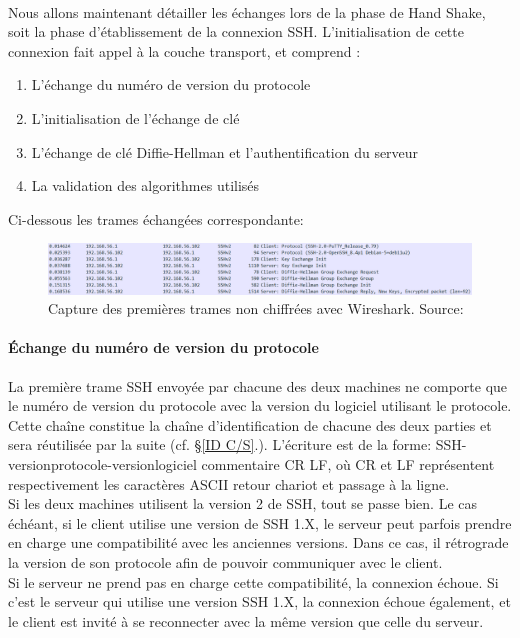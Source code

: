 \paragraph{}
Nous allons maintenant détailler les échanges lors de la phase de \og Hand Shake\fg, soit la phase d'établissement de la connexion SSH. L'initialisation de cette connexion fait appel à la couche transport, et comprend \cite{cadegros_etude_2023} :

\begin{enumerate}
    \item L'échange du numéro de version du protocole
    \item L'initialisation de l'échange de clé
    \item L'échange de clé Diffie-Hellman et l'authentification du serveur
    \item La validation des algorithmes utilisés
\end{enumerate}

Ci-dessous les trames échangées correspondante:

\begin{figure}[H]
    \centering
    \includegraphics[scale=0.6]{images/Trames_non_chifrees.png}
    \caption{Capture des premières trames non chiffrées avec Wireshark. Source: \cite{cadegros_etude_2023}}
\end{figure}

\paragraph{Échange du numéro de version du protocole} \label{S ID C/S}
La première trame SSH envoyée par chacune des deux machines ne comporte que le numéro de version du protocole avec la version du logiciel utilisant le protocole. Cette chaîne constitue la chaîne d'identification de chacune des deux parties et sera réutilisée par la suite (cf. §\ref{ID C/S}.). L'écriture est de la forme: {\ttfamily SSH-versionprotocole-versionlogiciel commentaire CR LF}, où CR et LF représentent respectivement les caractères ASCII retour chariot et passage à la ligne.\\
Si les deux machines utilisent la version 2 de SSH, tout se passe bien. Le cas échéant, si le client utilise une version de SSH 1.X, le serveur peut parfois prendre en charge une compatibilité avec les anciennes versions. Dans ce cas, il rétrograde la version de son protocole afin de pouvoir communiquer avec le client.\\ 
Si le serveur ne prend pas en charge cette compatibilité, la connexion échoue. Si c'est le serveur qui utilise une version SSH 1.X, la connexion échoue également, et le client est invité à se reconnecter avec la même version que celle du serveur.\cite{lonvick_secure_2006}

